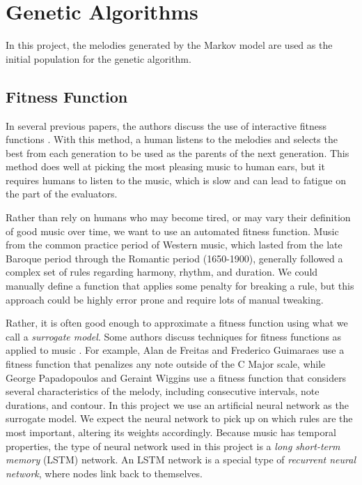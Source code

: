 \chapter{Genetic Algorithms} \label{ga}

In this project, the melodies generated by the Markov model are used as the initial population for the genetic algorithm.

\section{Fitness Function} \label{ga:fitness}

In several previous papers, the authors discuss the use of interactive fitness functions \cite{papadopoulos_ai_1999, mcvicar_autoguitartab:_2015}.
With this method, a human listens to the melodies and selects the best from each generation to be used as the parents of the next generation.
This method does well at picking the most pleasing music to human ears, but it requires humans to listen to the music, which is slow and can lead to fatigue on the part of the evaluators.

Rather than rely on humans who may become tired, or may vary their definition of good music over time, we want to use an automated fitness function.
Music from the common practice period of Western music, which lasted from the late Baroque period through the Romantic period (1650-1900), generally followed a complex set of rules regarding harmony, rhythm, and duration.
We could manually define a function that applies some penalty for breaking a rule, but this approach could be highly error prone and require lots of manual tweaking.

Rather, it is often good enough to approximate a fitness function using what we call a \textit{surrogate model}. %
Some authors discuss techniques for fitness functions as applied to music \cite{papadopoulos_ai_1999, de_freitas_originality_2011, alfonseca_fitness_2006}.
For example, Alan de Freitas and Frederico Guimaraes use a fitness function that penalizes any note outside of the C Major scale, while George Papadopoulos and Geraint Wiggins use a fitness function that considers several characteristics of the melody, including consecutive intervals, note durations, and contour.
In this project we use an artificial neural network as the surrogate model.
We expect the neural network to pick up on which rules are the most important, altering its weights accordingly.
Because music has temporal properties, the type of neural network used in this project is a \textit{long short-term memory} (LSTM) network.
An LSTM network is a special type of \textit{recurrent neural network}, where nodes link back to themselves. %

